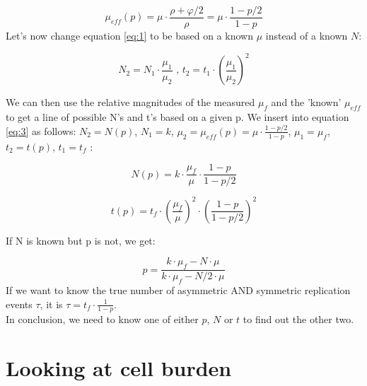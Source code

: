 \documentclass{article}
\numberwithin{equation}{subsection}
\begin{document}
	$$ 
	\mu_{eff}(p) = \mu \cdot \frac{\rho +\varphi/2}{\rho} = \mu \cdot \frac{1 - p/2}{ 1 - p}  
	$$ 
	Let's now change equation \ref{eq:1} to be based on a known $ \mu $ instead of a known $ N $:
	
	\begin{equation}
	N_2 = N_1 \cdot \frac{\mu_1}{\mu_2}  \text{ , } t_2 = t_1 \cdot (\frac{\mu_1}{\mu_2})^2
	\label{eq:3}
	\end{equation}
	
	We can then use the relative magnitudes of the measured $ \mu_f $ and the 'known' $ \mu_{eff}$ to get a line of possible N's and t's based on a given p. We insert into equation \ref{eq:3} as follows: $N_2 = N(p) $, $ N_1 = k$, $ \mu_2 = \mu_{eff}(p) = \mu \cdot \frac{1 - p/2}{ 1 - p}  $, $ \mu_1 = \mu_f$, $t_2 = t(p) $, $ t_1 = t_f$ $ $:
	
	$$
	N(p) = k \cdot \frac{\mu_f}{\mu} \cdot \frac{1 - p}{ 1 - p/2}
	$$
	
	$$
	t(p) = t_f \cdot (\frac{\mu_f}{\mu})^2 \cdot (\frac{1 - p}{ 1 - p/2})^2
	$$
	
	If N is known but p is not, we get:
	
	$$
	p = \frac{k \cdot \mu_f - N \cdot \mu }{k \cdot \mu_f - N/2 \cdot \mu}
	$$
	If we want to know the true number of asymmetric AND symmetric replication events $ \tau $, it is $ \tau = t_f \cdot \frac{1}{1-p}$.\\
	
	In conclusion, we need to know one of either $p$, $N$ or $t$ to find out the other two.
	
	\section{Looking at cell burden}
	
\end{document}
